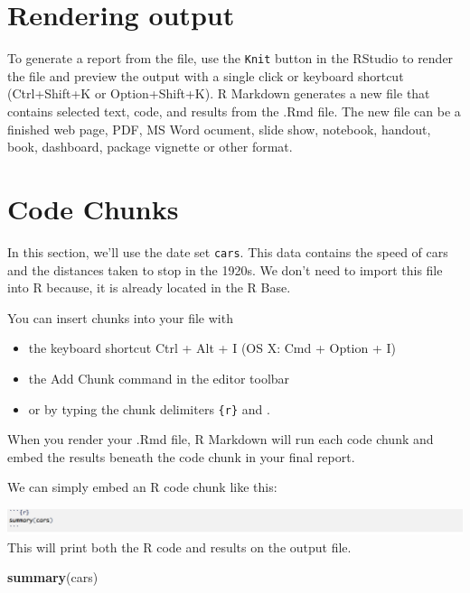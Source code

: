 \documentclass[]{article}
\newenvironment{Shaded}{\begin{snugshade}}{\end{snugshade}}
\newcommand{\KeywordTok}[1]{\textcolor[rgb]{0.13,0.29,0.53}{\textbf{#1}}}
\newcommand{\NormalTok}[1]{#1}
\providecommand{\tightlist}{%
  \setlength{\itemsep}{0pt}\setlength{\parskip}{0pt}}
\begin{document}
\hypertarget{rendering-output}{%
\section{Rendering output}\label{rendering-output}}

To generate a report from the file, use the \texttt{Knit} button in the
RStudio to render the file and preview the output with a single click or
keyboard shortcut (Ctrl+Shift+K or Option+Shift+K). R Markdown generates
a new file that contains selected text, code, and results from the .Rmd
file. The new file can be a finished web page, PDF, MS Word ocument,
slide show, notebook, handout, book, dashboard, package vignette or
other format.

\hypertarget{code-chunks}{%
\section{Code Chunks}\label{code-chunks}}

In this section, we'll use the date set \texttt{cars}. This data
contains the speed of cars and the distances taken to stop in the 1920s.
We don't need to import this file into R because, it is already located
in the R Base.

You can insert chunks into your file with

\begin{itemize}
\tightlist
\item
  the keyboard shortcut Ctrl + Alt + I (OS X: Cmd + Option + I)
\item
  the Add Chunk command in the editor toolbar
\item
  or by typing the chunk delimiters
  \texttt{\textasciigrave{}\textasciigrave{}\textasciigrave{}\{r\}} and
  \texttt{\textasciigrave{}\textasciigrave{}\textasciigrave{}}.
\end{itemize}

When you render your .Rmd file, R Markdown will run each code chunk and
embed the results beneath the code chunk in your final report.

We can simply embed an R code chunk like this:

\includegraphics{picture1.png} This will print both the R code and
results on the output file.

\begin{Shaded}
\begin{Highlighting}[]
\KeywordTok{summary}\NormalTok{(cars)}
\end{Highlighting}
\end{Shaded}
\end{document}
